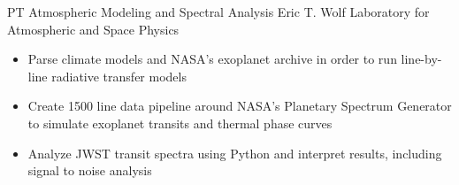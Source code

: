 {PT} %
{Atmospheric Modeling and Spectral Analysis} %
{Eric T. Wolf} %
{Laboratory for Atmospheric and Space Physics}
{\begin{itemize}
\setlength\itemsep{0.1em}
\item Parse climate models and NASA's exoplanet archive in order to run line-by-line radiative transfer models
\item Create 1500 line data pipeline around NASA's Planetary Spectrum Generator to simulate exoplanet transits and thermal phase curves
\item Analyze JWST transit spectra using Python and interpret results, including signal to noise analysis
\end{itemize}
}